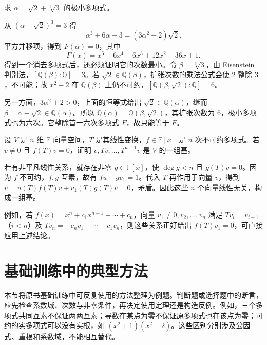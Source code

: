 \begin{example}
\label{ex:poly-mixed-radical-minimal}
求 $\alpha=\sqrt2+\sqrt[3]{3}$ 的极小多项式。
\end{example}
\begin{solve}
从 $(\alpha-\sqrt2)^3=3$ 得
\[
    \alpha^3+6\alpha-3=(3\alpha^2+2)\sqrt2.
\]
平方并移项，得到 $F(\alpha)=0$，其中
\[
    F(x)=x^6-6x^4-6x^3+12x^2-36x+1.
\]
得到一个消去多项式后，还必须证明它的次数最小。令 $\beta=\sqrt[3]{3}$，由 Eisenstein 判别法，$[\mathbb Q(\beta):\mathbb Q]=3$。若 $\sqrt2\in\mathbb Q(\beta)$，扩张次数的乘法公式会使 $2$ 整除 $3$，不可能；故 $x^2-2$ 在 $\mathbb Q(\beta)$ 上仍不可约，$[\mathbb Q(\beta,\sqrt2):\mathbb Q]=6$。

另一方面，$3\alpha^2+2>0$，上面的恒等式给出 $\sqrt2\in\mathbb Q(\alpha)$，继而 $\beta=\alpha-\sqrt2\in\mathbb Q(\alpha)$。所以 $\mathbb Q(\alpha)=\mathbb Q(\beta,\sqrt2)$，其扩张次数为 $6$，极小多项式也为六次。它整除首一六次多项式 $F$，故只能等于 $F$。
\end{solve}

\begin{example}
\label{ex:poly-cyclic-basis}
设 $V$ 是 $n$ 维 $\mathbb F$ 向量空间，$T$ 是其线性变换，$f\in\mathbb F[x]$ 是 $n$ 次不可约多项式。若 $v\ne0$ 且 $f(T)v=0$，证明 $v,Tv,\ldots,T^{n-1}v$ 是 $V$ 的一组基。
\end{example}
\begin{solve}
若有非平凡线性关系，就存在非零 $g\in\mathbb F[x]$，使 $\deg g<n$ 且 $g(T)v=0$。因为 $f$ 不可约，$f,g$ 互素，故有 $fu+gv_1=1$。代入 $T$ 再作用于向量 $v$，得到 $v=u(T)f(T)v+v_1(T)g(T)v=0$，矛盾。因此这些 $n$ 个向量线性无关，构成一组基。

例如，若 $f(x)=x^n+c_1x^{n-1}+\cdots+c_n$，向量 $v_1\ne0,v_2,\ldots,v_n$ 满足 $Tv_i=v_{i+1}$（$i<n$）及 $Tv_n=-c_nv_1-\cdots-c_1v_n$，则这些关系正好给出 $f(T)v_1=0$，可直接应用上述结论。
\end{solve}

\section{基础训练中的典型方法}
\label{sec:poly-training}

本节将原书基础训练中可反复使用的方法整理为例题。判断题或选择题中的断言，应先检查系数域、次数与非零条件，再决定使用定理还是构造反例。例如，三个多项式共同互素不保证两两互素；导数在某点为零不保证原多项式也在该点为零；可约的实多项式可以没有实根，如 $(x^2+1)(x^2+2)$。这些区别分别涉及公因式、重根和系数域，不能相互替代。

